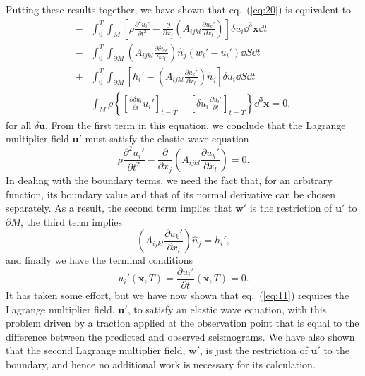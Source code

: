 Putting these results together, we have shown that eq.~(\ref{eq:20}) is equivalent to
\begin{align}
-&\int_{0}^{T}\int_{M}\left[\rho\frac{\partial^{2}u_{i}'}{\partial t^{2}}-\frac{\partial}{\partial x_{j}}\left(A_{ijkl}\frac{\partial u_{k}'}{\partial x_{l}}\right)\right]\delta u_{i}\dd^{3}\mathbf{x}\dd t \nonumber \\
-&\int_{0}^{T}\int_{\partial M}\left(A_{ijkl}\frac{\partial\delta u_{k}}{\partial x_{l}}\right)\hat{n}_{j}(w_{i}'-u_{i}')\dd S\dd t \nonumber \\
+&\int_{0}^{T}\int_{\partial M}\left[h_{i}'-\left(A_{ijkl}\frac{\partial u_{k}'}{\partial x_{l}}\right)\hat{n}_{j}\right]\delta u_{i}\dd S\dd t \nonumber \\
-&\int_{M}\rho\left\{\left[\frac{\partial\delta u_{i}}{\partial t}u_{i}'\right]_{t=T}-\left[\delta u_{i}\frac{\partial u_{i}'}{\partial t}\right]_{t=T}\right\}\dd^{3}\mathbf{x}=0,
\label{eq:25}
\end{align}
for all $\delta \mathbf{u}$. From the first term in this equation, we conclude that the Lagrange 
multiplier field $\mathbf{u}'$ must satisfy the elastic wave equation
\begin{equation}
\rho\frac{\partial^{2}u_{i}'}{\partial t^{2}}-\frac{\partial}{\partial x_{j}}\left(A_{ijkl}\frac{\partial u_{k}'}{\partial x_{l}}\right)=0.
\label{eq:26}
\end{equation}
In dealing with the boundary terms, we need the fact that, for an arbitrary function, its boundary value and that of 
its normal derivative can be chosen separately. As a result, the second term implies that $\mathbf{w}'$ is the restriction 
of $\mathbf{u}'$ to $\partial M$, the third term implies
\begin{equation}
\left(A_{ijkl}\frac{\partial u_{k}'}{\partial x_{l}}\right)\hat{n}_{j}=h_{i}',
\label{eq:27}
\end{equation}
and finally we have the terminal conditions
\begin{equation}
u_{i}'(\mathbf{x},T)=\frac{\partial u_{i}'}{\partial t}(\mathbf{x},T)=0.
\label{eq:28}
\end{equation}
It has taken some effort, but we have now shown that eq.~(\ref{eq:11}) requires the Lagrange multiplier field, $\mathbf{u}'$, 
to satisfy an elastic wave equation, with this problem driven by a traction applied at the observation point that is 
equal to the difference between the predicted and observed seismograms. We have also shown that the second 
Lagrange multiplier field, $\mathbf{w}'$, is just the restriction of $\mathbf{u}'$ to the boundary, and 
hence no additional work is necessary for its calculation.

